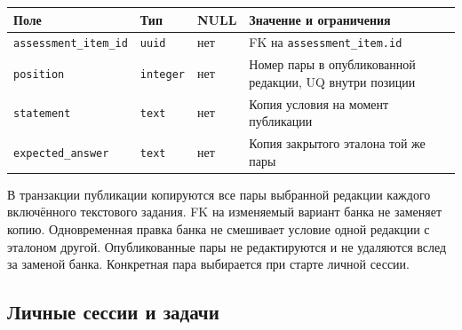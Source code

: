 \documentclass[12pt,a4paper]{article}
\newcounter{none} %
\begin{document}
\hypertarget{таблица-assessment_variant}{}

{\def\LTcaptype{none} %
\begin{longtable}[]{@{}
  >{\raggedright\arraybackslash}p{}
  >{\raggedright\arraybackslash}p{}
  >{\raggedright\arraybackslash}p{}
  >{\raggedright\arraybackslash}p{}@{}}
\toprule\noalign{}
\begin{minipage}[b]{\linewidth}\raggedright
Поле
\end{minipage} & \begin{minipage}[b]{\linewidth}\raggedright
Тип
\end{minipage} & \begin{minipage}[b]{\linewidth}\raggedright
NULL
\end{minipage} & \begin{minipage}[b]{\linewidth}\raggedright
Значение и ограничения
\end{minipage} \\
\midrule\noalign{}
\endhead
\bottomrule\noalign{}
\endlastfoot
\texttt{assessment\_\allowbreak{}item\_\allowbreak{}id} & \texttt{uuid} & нет & FK на \texttt{assessment\_\allowbreak{}item.\allowbreak{}id} \\
\texttt{position} & \texttt{integer} & нет & Номер пары в опубликованной редакции, UQ внутри позиции \\
\texttt{statement} & \texttt{text} & нет & Копия условия на момент публикации \\
\texttt{expected\_\allowbreak{}answer} & \texttt{text} & нет & Копия закрытого эталона той же пары \\
\end{longtable}
}

В транзакции публикации копируются все пары выбранной редакции каждого включённого текстового задания. FK на изменяемый вариант банка не заменяет копию. Одновременная правка банка не смешивает условие одной редакции с эталоном другой. Опубликованные пары не редактируются и не удаляются вслед за заменой банка. Конкретная пара выбирается при старте личной сессии.

\subsection{Личные сессии и задачи}\label{ux43bux438ux447ux43dux44bux435-ux441ux435ux441ux441ux438ux438-ux438-ux437ux430ux434ux430ux447ux438}
\end{document}
